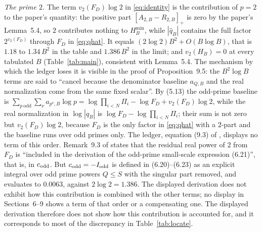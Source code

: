 \documentclass[11pt]{amsart}
\theoremstyle{definition}
\newcommand{\qhat}{\widehat{q}}
\begin{document}
\emph{The prime $2$.} The term $v_2(F_D)\log2$ in \eqref{eq:identity} is the contribution of $p=2$ to the
paper's quantity: the positive part $[A_{2,B}-R_{2,B}]_+$ is zero by the paper's Lemma~5.4, so $2$ contributes
nothing to $H_B^{\min}$, while $|\qhat_B|$ contains the full factor $2^{v_2(F_D)}$ through $F_D$ in
\eqref{eq:qhat}. It equals $(2\log2)B^2+O(B\log B)$, that is $1.18$ to $1.34\,B^2$ in the table and $1.386\,B^2$
in the limit; and $v_2(H_B)=0$ at every tabulated $B$ (Table~\ref{tab:main}), consistent with Lemma~5.4. The
mechanism by which the ledger loses it is visible in the proof of Proposition~9.5: the $B^2\log B$ terms are said
to ``cancel because the denominator baseline $a_{Q,B}$ and the real normalization come from the same fixed
scalar''. By (5.13) the odd-prime baseline is $\sum_{p\ \mathrm{odd}}\sum_\nu a_{p^\nu,B}\log p=\log\prod_{i<N}\Pi_i-\log F_D+v_2(F_D)\log2$,
while the real normalization in $\log|\qhat_B|$ is $\log F_D-\log\prod_{i<N}\Pi_i$; their sum is not zero but
$v_2(F_D)\log2$, because $F_D$ is the only factor in \eqref{eq:qhat} with a $2$-part and the baseline runs over odd
primes only. The ledger, equation (9.3) of \cite{Sun26}, displays no term of this order. Remark~9.3 of \cite{Sun26} states
that the residual real power of $2$ from $F_D$ is ``included in the derivation of the odd-prime small-scale
expression (6.21)'', that is, in $c_{\rm odd}$. But $c_{\rm odd}=-I_{\rm odd}$ is defined in (6.20)--(6.23) as an explicit integral over odd prime powers $Q\le S$ with the singular part removed, and evaluates to $0.0063$, against $2\log2=1.386$. The displayed derivation does not exhibit how this contribution is combined with the other terms; no display in Sections~6--9 shows a term of that order or a compensating one. The displayed derivation therefore does not show how this contribution is accounted for, and it corresponds to most of the discrepancy in Table~\ref{tab:locate}.
\end{document}
